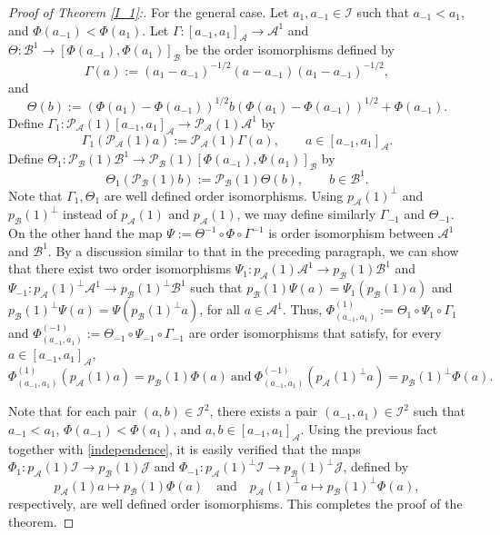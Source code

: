 \documentclass[12pt]{amsart}
\theoremstyle{definition}
\theoremstyle{remark}
\numberwithin{equation}{section}
\begin{document}
\begin{proof}[Proof of Theorem \ref{I_1}:]
	For the general case. Let  $a_1,a_{-1}\in\mathcal{I}$ such that $a_{-1}<a_{1}$,  and $\Phi(a_{-1})<\Phi(a_1)$.
	Let $\Gamma:[a_{-1},a_1]_\mathcal{A}\to\mathcal{A}^1$ and $\Theta:\mathcal{B}^1 \to[\Phi(a_{-1}),\Phi(a_1)]_{\mathcal{B}}$ be the order isomorphisms defined by 
	$$\Gamma(a):= (a_1-a_{-1})^{-1/2}(a-a_{-1})(a_1-a_{-1})^{-1/2},$$
	and 
	$$\Theta(b):=\left( \Phi(a_1)-\Phi(a_{-1})\right) ^{1/2}b\left( \Phi(a_1)-\Phi(a_{-1})\right)^{1/2} +\Phi(a_{-1}).$$
	Define $\Gamma_1: \mathcal{P}_\mathcal{A} (1)[a_{-1},a_{1}]_\mathcal{A}\to \mathcal{P}_\mathcal{A} (1)\mathcal{A}^1$   by 
	$$\Gamma_1\left(\mathcal{P}_\mathcal{A} (1)a\right) :=\mathcal{P}_\mathcal{A} (1)\Gamma(a),  \qquad a\in [a_{-1},a_1]_\mathcal{A}.$$
	Define   $\Theta_1:\mathcal{P}_\mathcal{B} (1)\mathcal{B}^1 \to  \mathcal{P}_\mathcal{B} (1)[\Phi(a_{-1}),\Phi(a_{1})]_\mathcal{B}$ by 
	$$\Theta_1\left(\mathcal{P}_\mathcal{B} (1)b\right) :=\mathcal{P}_\mathcal{B} (1)\Theta(b),  \qquad b\in \mathcal{B}^1.$$
	Note that $\Gamma_1, \Theta_1$ are  well defined order isomorphisms. Using $p_\mathcal{A} (1)^{\perp}$ and $p_\mathcal{B} (1)^{\perp}$  instead of $p_\mathcal{A}(1)$ and $p_\mathcal{A}(1)$, we may define similarly $\Gamma_{-1}$ and $\Theta_{-1}$. On the other hand  the map $\Psi:=\Theta^{-1}\circ\Phi\circ \Gamma^{-1}$  is  order isomorphism between $\mathcal{A}^1$  and $\mathcal{B}^1$.  By a discussion similar to that in the preceding
	paragraph, we can show that there exist two order isomorphisms  $\Psi_1:p_\mathcal{A} (1)\mathcal{A}^1\to p_\mathcal{B}(1)\mathcal{B}^1$  and $\Psi_{-1}:p_\mathcal{A} (1)^\perp\mathcal{A}^1\to p_\mathcal{B} (1)^\perp\mathcal{B}^1$ such that $p_\mathcal{B} (1)\Psi(a)=\Psi_1\left( p_\mathcal{B} (1)a\right)$ and $p_\mathcal{B} (1)^\perp\Psi(a)=\Psi\left( p_\mathcal{B} (1)^\perp a\right)$, for all $a\in\mathcal{A}^{1}$. Thus, $\Phi_{(a_{-1},a_1)}^{(1)}:=\Theta_1\circ \Psi_1 \circ \Gamma_1$  and $\Phi_{(a_{-1},a_1)}^{(-1)}:=\Theta_{-1}\circ \Psi_{-1} \circ \Gamma_{-1}$ are order isomorphisms that satisfy, for every $a\in[a_{-1},a_1]_{\mathcal{A}}$,
	\begin{equation}\label{independence}
		\Phi_{(a_{-1},a_1)}^{(1)}\left( p_\mathcal{A} (1)a\right)=p_\mathcal{B} (1)\Phi\left(a\right)\ \mbox{and} \   \Phi_{(a_{-1},a_1)}^{(-1)}\left( p_\mathcal{A} (1)^\perp a\right)=p_\mathcal{B} (1)^\perp\Phi\left( a\right).	
	\end{equation}  
	
	Note that for each pair $(a,b) \in \mathcal{I}^2$, there exists a pair $(a_{-1},a_1) \in \mathcal{I}^2$ such that $a_{-1} < a_1$, $\Phi(a_{-1}) < \Phi(a_1)$, and $a,b \in [a_{-1},a_1]_{\mathcal{A}}$. Using the previous fact together with \eqref{independence}, it is easily verified that the maps $\Phi_1 \colon p_\mathcal{A}(1)\mathcal{I} \to p_\mathcal{B}(1)\mathcal{J}$ and $\Phi_{-1} \colon p_\mathcal{A}(1)^\perp\mathcal{I} \to p_\mathcal{B}(1)^\perp\mathcal{J}$, defined by  
	$$
	p_\mathcal{A}(1)a \mapsto p_\mathcal{B}(1)\Phi(a) \quad \text{and} \quad p_\mathcal{A}(1)^\perp a \mapsto p_\mathcal{B}(1)^\perp\Phi(a),
	$$ 
	respectively, are well defined order isomorphisms. This completes the proof of the theorem.
\end{proof}	
\end{document}
